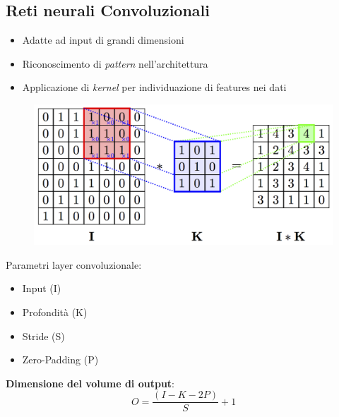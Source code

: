 \documentclass[xcolor=x11names,compress, 
]{beamer}
\theoremstyle{definition} \newtheorem{esempio}{Esempio}
\theoremstyle{definition}
\begin{document}
	\subsection{Reti neurali Convoluzionali}
		\begin{frame}{\subsecname}
			\begin{itemize}
				\item Adatte ad input di grandi dimensioni\pause
				\item Riconoscimento di \textit{pattern} nell'architettura\pause
				\item Applicazione di \textit{kernel} per individuazione di features nei dati
			\end{itemize}
			\begin{figure}
				\includegraphics[scale=0.9]{immagini/convolution}
			\end{figure}
		\end{frame}
		\begin{frame}{\subsecname}
			Parametri layer convoluzionale:
			\begin{itemize}
				\item Input (I)
				\item Profondità (K)
				\item Stride (S)
				\item Zero-Padding (P)
			\end{itemize}\pause
			\begin{center}
				\textbf{Dimensione del volume di output}:
				\begin{equation}
					O={\frac{(I - K - 2P)}{S} +1}
				\end{equation}
			\end{center}
		\end{frame}
\end{document}
